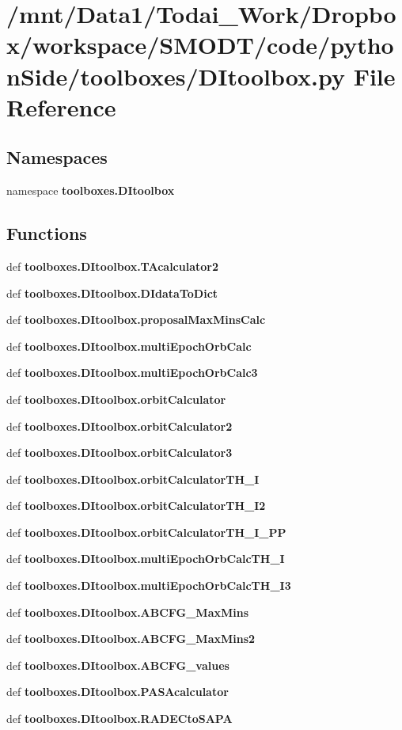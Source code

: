 \section{/mnt/\-Data1/\-Todai\-\_\-\-Work/\-Dropbox/workspace/\-S\-M\-O\-D\-T/code/python\-Side/toolboxes/\-D\-Itoolbox.py File Reference}
\label{_d_itoolbox_8py}
\subsection*{Namespaces}
\begin{DoxyCompactItemize}
\item 
namespace {\bf toolboxes.\-D\-Itoolbox}
\end{DoxyCompactItemize}
\subsection*{Functions}
\begin{DoxyCompactItemize}
\item 
def {\bf toolboxes.\-D\-Itoolbox.\-T\-Acalculator2}
\item 
def {\bf toolboxes.\-D\-Itoolbox.\-D\-Idata\-To\-Dict}
\item 
def {\bf toolboxes.\-D\-Itoolbox.\-proposal\-Max\-Mins\-Calc}
\item 
def {\bf toolboxes.\-D\-Itoolbox.\-multi\-Epoch\-Orb\-Calc}
\item 
def {\bf toolboxes.\-D\-Itoolbox.\-multi\-Epoch\-Orb\-Calc3}
\item 
def {\bf toolboxes.\-D\-Itoolbox.\-orbit\-Calculator}
\item 
def {\bf toolboxes.\-D\-Itoolbox.\-orbit\-Calculator2}
\item 
def {\bf toolboxes.\-D\-Itoolbox.\-orbit\-Calculator3}
\item 
def {\bf toolboxes.\-D\-Itoolbox.\-orbit\-Calculator\-T\-H\-\_\-\-I}
\item 
def {\bf toolboxes.\-D\-Itoolbox.\-orbit\-Calculator\-T\-H\-\_\-\-I2}
\item 
def {\bf toolboxes.\-D\-Itoolbox.\-orbit\-Calculator\-T\-H\-\_\-\-I\-\_\-\-P\-P}
\item 
def {\bf toolboxes.\-D\-Itoolbox.\-multi\-Epoch\-Orb\-Calc\-T\-H\-\_\-\-I}
\item 
def {\bf toolboxes.\-D\-Itoolbox.\-multi\-Epoch\-Orb\-Calc\-T\-H\-\_\-\-I3}
\item 
def {\bf toolboxes.\-D\-Itoolbox.\-A\-B\-C\-F\-G\-\_\-\-Max\-Mins}
\item 
def {\bf toolboxes.\-D\-Itoolbox.\-A\-B\-C\-F\-G\-\_\-\-Max\-Mins2}
\item 
def {\bf toolboxes.\-D\-Itoolbox.\-A\-B\-C\-F\-G\-\_\-values}
\item 
def {\bf toolboxes.\-D\-Itoolbox.\-P\-A\-S\-Acalculator}
\item 
def {\bf toolboxes.\-D\-Itoolbox.\-R\-A\-D\-E\-Cto\-S\-A\-P\-A}
\end{DoxyCompactItemize}
